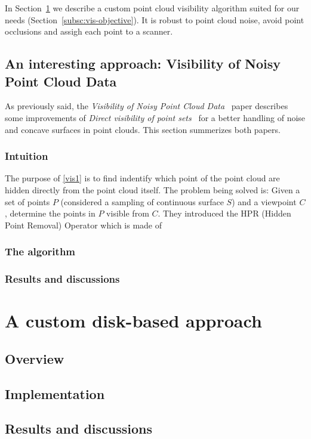 In Section~\ref{sc:custom} we describe a custom point cloud visibility algorithm suited for our needs (Section~\ref{subsc:vis-objective}). It is robust to point cloud noise, avoid point occlusions and assigh each point to a scanner.

\subsection{An interesting approach: Visibility of Noisy Point Cloud Data}
\label{subsc:noisy}
As previously said, the \emph{Visibility of Noisy Point Cloud Data}~\cite{vis1} paper describes some improvements of \emph{Direct visibility of point sets}~\cite{vis1} for a better handling of noise and concave surfaces in point clouds. This section summerizes both papers.

\subsubsection{Intuition}
The purpose of \ref{vis1} is to find indentify which point of the point cloud are hidden directly from the point cloud itself. The problem being solved is: Given a set of points $P$ (considered a sampling of continuous surface $S$) and a viewpoint $C$, determine the points in $P$ visible from $C$. They introduced the HPR (Hidden Point Removal) Operator which is made of

\subsubsection{The algorithm}

\subsubsection{Results and discussions}


\section{A custom disk-based approach}
\label{sc:custom}

\subsection{Overview}


\subsection{Implementation}


\subsection{Results and discussions}
